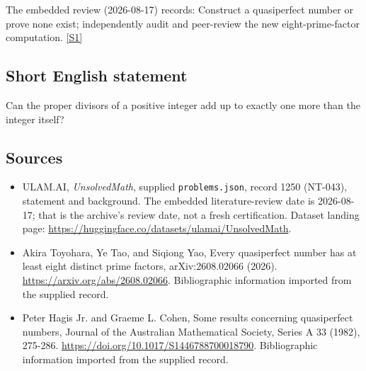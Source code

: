 \documentclass[11pt,a4paper]{article}
\newcommand{\sref}[2]{\hyperlink{source:#1:#2}{[S#2]}}
\begin{document}
The embedded review (2026-08-17) records: Construct a quasiperfect number or prove none exist; independently audit and peer-review the new eight-prime-factor computation. \sref{1250}{1}

\subsection{Short English statement}

Can the proper divisors of a positive integer add up to exactly one more than the integer itself?

\subsection{Sources}

{\small

\begin{itemize}

\item[\hypertarget{source:1250:1}{S1}] ULAM.AI, \emph{UnsolvedMath}, supplied \texttt{problems.json}, record 1250 (NT-043), statement and background. The embedded literature-review date is 2026-08-17; that is the archive’s review date, not a fresh certification. Dataset landing page: \url{https://huggingface.co/datasets/ulamai/UnsolvedMath}.

\item[\hypertarget{source:1250:2}{S2}] Akira Toyohara, Ye Tao, and Siqiong Yao, Every quasiperfect number has at least eight distinct prime factors, arXiv:2608.02066 (2026). \url{https://arxiv.org/abs/2608.02066}. Bibliographic information imported from the supplied record.

\item[\hypertarget{source:1250:3}{S3}] Peter Hagis Jr. and Graeme L. Cohen, Some results concerning quasiperfect numbers, Journal of the Australian Mathematical Society, Series A 33 (1982), 275-286. \url{https://doi.org/10.1017/S1446788700018790}. Bibliographic information imported from the supplied record.

\end{itemize}

}

\label{end:1250}
\end{document}
